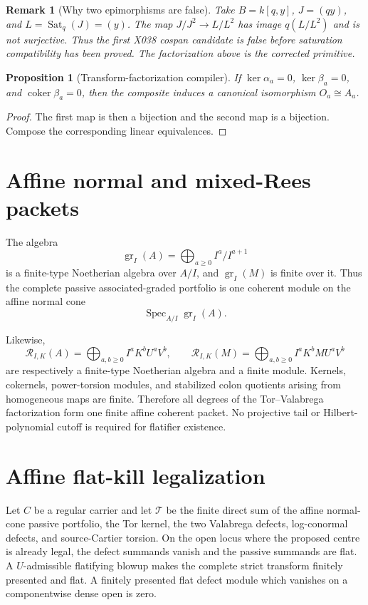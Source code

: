 \documentclass[11pt]{amsart}
\newtheorem{proposition}[theorem]{Proposition}
\newtheorem{remark}[theorem]{Remark}
\begin{document}
\begin{remark}[Why two epimorphisms are false]
Take $B=k[q,y]$, $J=(qy)$, and $L=\operatorname{Sat}_q(J)=(y)$.  The map
$J/J^2\to L/L^2$ has image $q(L/L^2)$ and is not surjective.  Thus the first
X038 cospan candidate is false before saturation compatibility has been
proved.  The factorization above is the corrected primitive.
\end{remark}

\begin{proposition}[Transform-factorization compiler]
If $\ker\alpha_a=0$, $\ker\beta_a=0$, and
$\operatorname{coker}\beta_a=0$, then the composite induces a canonical
isomorphism $O_a\cong A_a$.
\end{proposition}

\begin{proof}
The first map is then a bijection and the second map is a bijection.  Compose
the corresponding linear equivalences.
\end{proof}

\section{Affine normal and mixed-Rees packets}
The algebra
\[
 \operatorname{gr}_I(A)=\bigoplus_{a\geq0}I^a/I^{a+1}
\]
is a finite-type Noetherian algebra over $A/I$, and
$\operatorname{gr}_I(M)$ is finite over it.  Thus the complete passive
associated-graded portfolio is one coherent module on the affine normal cone
\[
 \operatorname{Spec}_{A/I}\operatorname{gr}_I(A).
\]

Likewise,
\[
 \mathcal R_{I,K}(A)=
 \bigoplus_{a,b\geq0}I^aK^bU^aV^b,
 \qquad
 \mathcal R_{I,K}(M)=
 \bigoplus_{a,b\geq0}I^aK^bM U^aV^b
\]
are respectively a finite-type Noetherian algebra and a finite module.  Kernels,
cokernels, power-torsion modules, and stabilized colon quotients arising from
homogeneous maps are finite.  Therefore all degrees of the Tor--Valabrega
factorization form one finite affine coherent packet.  No projective tail or
Hilbert-polynomial cutoff is required for flatifier existence.

\section{Affine flat-kill legalization}
Let $C$ be a regular carrier and let $\mathcal T$ be the finite direct sum of
the affine normal-cone passive portfolio, the Tor kernel, the two Valabrega
defects, log-conormal defects, and source-Cartier torsion.  On the open locus
where the proposed centre is already legal, the defect summands vanish and the
passive summands are flat.  A $U$-admissible flatifying blowup makes the complete
strict transform finitely presented and flat.  A finitely presented flat
defect module which vanishes on a componentwise dense open is zero.
\end{document}
